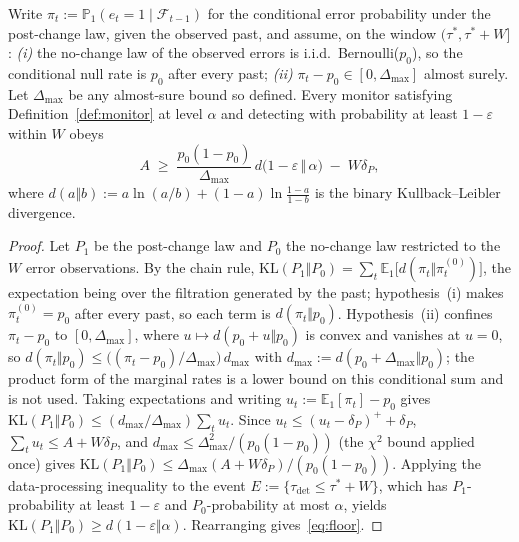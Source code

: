 \begin{theorem}\label{thm:floor}
  Write $\pi_t := \mathbb{P}_1(e_t = 1 \mid \mathcal{F}_{t-1})$ for the
  conditional error probability under the post-change law, given the
  observed past, and assume, on the window $(\tau^*, \tau^* + W]$:
  \emph{(i)} the no-change law of the observed errors is i.i.d.\
  Bernoulli($p_0$), so the conditional null rate is $p_0$ after every
  past; \emph{(ii)} $\pi_t - p_0 \in [0, \Delta_{\max}]$ almost surely.
  Let $\Delta_{\max}$ be any almost-sure bound so defined. Every monitor
  satisfying Definition~\ref{def:monitor} at level $\alpha$ and detecting
  with probability at least $1 - \varepsilon$ within $W$ obeys
  \begin{equation}\label{eq:floor}
    A \;\ge\; \frac{p_0(1-p_0)}{\Delta_{\max}}\,
              d\bigl(1-\varepsilon \,\Vert\, \alpha\bigr) \;-\; W \delta_P ,
  \end{equation}
  where $d(a \Vert b) := a \ln(a/b) + (1-a)\ln\frac{1-a}{1-b}$ is the binary
  Kullback--Leibler divergence.
\end{theorem}

\begin{proof}
  Let $P_1$ be the post-change law and $P_0$ the no-change law restricted to
  the $W$ error observations. By the chain rule,
  $\mathrm{KL}(P_1 \Vert P_0) = \sum_t \mathbb{E}_1\bigl[
  d(\pi_t \Vert \pi_t^{(0)})\bigr]$, the expectation being over the
  filtration generated by the past; hypothesis~(i) makes
  $\pi_t^{(0)} = p_0$ after every past, so each term is
  $d(\pi_t \Vert p_0)$. Hypothesis~(ii) confines $\pi_t - p_0$ to
  $[0, \Delta_{\max}]$, where $u \mapsto d(p_0 + u \Vert p_0)$ is convex and
  vanishes at $u = 0$, so $d(\pi_t \Vert p_0) \le
  \bigl((\pi_t - p_0)/\Delta_{\max}\bigr)\, d_{\max}$ with
  $d_{\max} := d(p_0 + \Delta_{\max} \Vert p_0)$; the product form of the
  marginal rates is a lower bound on this conditional sum and is not used.
  Taking expectations and writing $u_t := \mathbb{E}_1[\pi_t] - p_0$ gives
  $\mathrm{KL}(P_1 \Vert P_0) \le (d_{\max}/\Delta_{\max}) \sum_t u_t$.
  Since $u_t \le (u_t - \delta_P)^{+} + \delta_P$,
  $\sum_t u_t \le A + W\delta_P$, and $d_{\max} \le
  \Delta_{\max}^2/(p_0(1-p_0))$ (the $\chi^2$ bound applied once) gives
  $\mathrm{KL}(P_1 \Vert P_0) \le \Delta_{\max}(A + W\delta_P) /
  (p_0(1-p_0))$. Applying the data-processing inequality to the event
  $E := \{\tau_{\mathrm{det}} \le \tau^*+W\}$, which has $P_1$-probability at
  least $1-\varepsilon$ and $P_0$-probability at most $\alpha$, yields
  $\mathrm{KL}(P_1 \Vert P_0) \ge d(1-\varepsilon \Vert \alpha)$.
  Rearranging gives~\eqref{eq:floor}.
\end{proof}

